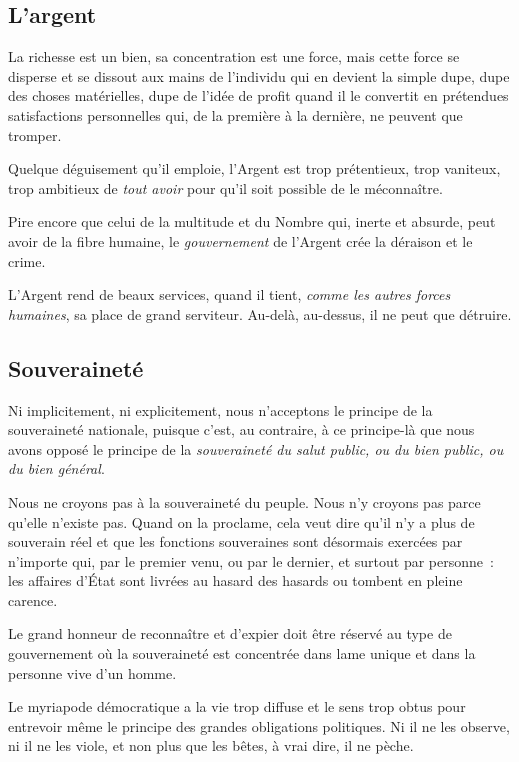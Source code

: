 \documentclass[french,twoside]{book} %
\newcommand{\astermono}{\medskip\centerline{\color{rubric}\large\selectfont{\syms ✻}}\medskip\par}%
\begin{document}
\astermono

\subsection[{L’argent}]{L’argent}
\noindent La richesse est un bien, sa concentration est une force, mais cette force se disperse et se dissout aux mains de l’individu qui en devient la simple dupe, dupe des choses matérielles, dupe de l’idée de profit quand il le convertit en prétendues satisfactions personnelles qui, de la première à la dernière, ne peuvent que tromper.\par
Quelque déguisement qu’il emploie, l’Argent est trop prétentieux, trop vaniteux, trop ambitieux de \emph{tout avoir} pour qu’il soit possible de le méconnaître.\par
Pire encore que celui de la multitude et du Nombre qui, inerte et absurde, peut avoir de la fibre humaine, le \emph{gouvernement} de l’Argent crée la déraison et le crime.\par
L’Argent rend de beaux services, quand il tient, \emph{comme les autres forces humaines}, sa place de grand serviteur. Au-delà, au-dessus, il ne peut que détruire.\par

\astermono

\subsection[{Souveraineté}]{Souveraineté}
\noindent Ni implicitement, ni explicitement, nous n’acceptons le principe de la souveraineté nationale, puisque c’est, au contraire, à ce principe-là que nous avons opposé le principe de la\emph{ souveraineté du salut public, ou du bien public, ou du bien général}.\par

\astermono

\noindent Nous ne croyons pas à la souveraineté du peuple. Nous n’y croyons pas parce qu’elle n’existe pas. Quand on la proclame, cela veut dire qu’il n’y a plus de souverain réel et que les fonctions souveraines sont désormais exercées par n’importe qui, par le premier venu, ou par le dernier, et surtout par personne : les affaires d’État sont livrées au hasard des hasards ou tombent en pleine carence.\par

\astermono

\noindent Le grand honneur de reconnaître et d’expier doit être réservé au type de gouvernement où la souveraineté est concentrée dans lame unique et dans la personne vive d’un homme.\par
Le myriapode démocratique a la vie trop diffuse et le sens trop obtus pour entrevoir même le principe des grandes obligations politiques. Ni il ne les observe, ni il ne les viole, et non plus que les bêtes, à vrai dire, il ne pèche.\par
\end{document}
